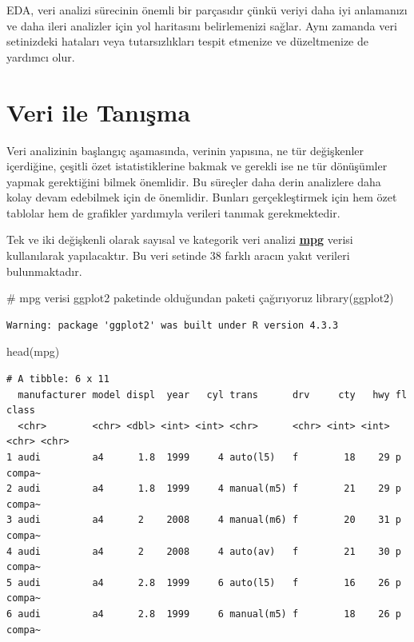 \documentclass[
  letterpaper,
  DIV=11,
  numbers=noendperiod]{scrreprt}
\newenvironment{Shaded}{\begin{snugshade}}{\end{snugshade}}
\newcommand{\CommentTok}[1]{\textcolor[rgb]{0.37,0.37,0.37}{#1}}
\newcommand{\FunctionTok}[1]{\textcolor[rgb]{0.28,0.35,0.67}{#1}}
\newcommand{\NormalTok}[1]{\textcolor[rgb]{0.00,0.23,0.31}{#1}}
\begin{document}
EDA, veri analizi sürecinin önemli bir parçasıdır çünkü veriyi daha iyi
anlamanızı ve daha ileri analizler için yol haritasını belirlemenizi
sağlar. Aynı zamanda veri setinizdeki hataları veya tutarsızlıkları
tespit etmenize ve düzeltmenize de yardımcı olur.

\section*{Veri ile Tanışma}\label{veri-ile-tanux131ux15fma}


Veri analizinin başlangıç aşamasında, verinin yapısına, ne tür
değişkenler içerdiğine, çeşitli özet istatistiklerine bakmak ve gerekli
ise ne tür dönüşümler yapmak gerektiğini bilmek önemlidir. Bu süreçler
daha derin analizlere daha kolay devam edebilmek için de önemlidir.
Bunları gerçekleştirmek için hem özet tablolar hem de grafikler
yardımıyla verileri tanımak gerekmektedir.

Tek ve iki değişkenli olarak sayısal ve kategorik veri analizi
\href{https://ggplot2.tidyverse.org/reference/mpg.html}{\ul{\textbf{mpg}}}
verisi kullanılarak yapılacaktır. Bu veri setinde 38 farklı aracın yakıt
verileri bulunmaktadır.

\begin{Shaded}
\begin{Highlighting}[]
\CommentTok{\# mpg verisi ggplot2 paketinde olduğundan paketi çağırıyoruz}
\FunctionTok{library}\NormalTok{(ggplot2)}
\end{Highlighting}
\end{Shaded}

\begin{verbatim}
Warning: package 'ggplot2' was built under R version 4.3.3
\end{verbatim}

\begin{Shaded}
\begin{Highlighting}[]
\FunctionTok{head}\NormalTok{(mpg)}
\end{Highlighting}
\end{Shaded}

\begin{verbatim}
# A tibble: 6 x 11
  manufacturer model displ  year   cyl trans      drv     cty   hwy fl    class 
  <chr>        <chr> <dbl> <int> <int> <chr>      <chr> <int> <int> <chr> <chr> 
1 audi         a4      1.8  1999     4 auto(l5)   f        18    29 p     compa~
2 audi         a4      1.8  1999     4 manual(m5) f        21    29 p     compa~
3 audi         a4      2    2008     4 manual(m6) f        20    31 p     compa~
4 audi         a4      2    2008     4 auto(av)   f        21    30 p     compa~
5 audi         a4      2.8  1999     6 auto(l5)   f        16    26 p     compa~
6 audi         a4      2.8  1999     6 manual(m5) f        18    26 p     compa~
\end{verbatim}
\end{document}
